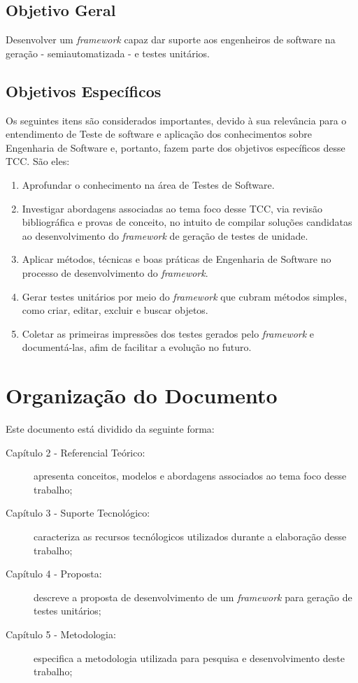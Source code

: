     \subsection{Objetivo Geral}
    Desenvolver um \textit{framework} capaz dar suporte aos engenheiros de software na geração - semiautomatizada - e testes unitários.
    
    \subsection{Objetivos Específicos}
    Os seguintes itens são considerados importantes, devido à sua relevância para o entendimento de Teste de software e aplicação dos conhecimentos sobre Engenharia de Software e, portanto, fazem parte dos objetivos específicos desse TCC. São eles:

    \begin{enumerate}
      \item Aprofundar o conhecimento na área de Testes de Software.
      
      \item Investigar abordagens associadas ao tema foco desse TCC, via revisão bibliográfica e provas de conceito, no intuito de compilar soluções candidatas ao desenvolvimento do \textit{framework} de geração de testes de unidade.
      
      \item Aplicar métodos, técnicas e boas práticas de Engenharia de Software no processo de desenvolvimento do \textit{framework}.
      
      \item Gerar testes unitários por meio do \textit{framework} que cubram métodos simples, como criar, editar, excluir e buscar objetos.

      \item Coletar as primeiras impressões dos testes gerados pelo \textit{framework} e documentá-las, afim de facilitar a evolução no futuro.

    \end{enumerate}
    
\section{Organização do Documento}
	Este documento está dividido da seguinte forma:
	
	\begin{description}
		\item[Capítulo 2 - Referencial Teórico:] apresenta conceitos, modelos e abordagens associados ao tema foco desse trabalho;
		\item[Capítulo 3 - Suporte Tecnológico:] caracteriza as recursos tecnólogicos utilizados durante a elaboração desse trabalho;
		\item[Capítulo 4 - Proposta:] descreve a proposta de desenvolvimento de um \textit{framework} para geração de testes unitários;
		\item[Capítulo 5 - Metodologia:] especifica a metodologia utilizada para pesquisa e desenvolvimento deste trabalho;
	\end{description}